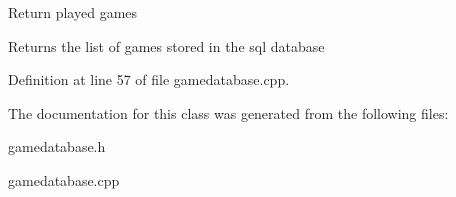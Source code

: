 Return played games \begin{DoxyReturn}{Returns}
the list of games stored in the sql database 
\end{DoxyReturn}


Definition at line 57 of file gamedatabase.\-cpp.



The documentation for this class was generated from the following files\-:\begin{DoxyCompactItemize}
\item 
gamedatabase.\-h\item 
gamedatabase.\-cpp\end{DoxyCompactItemize}
